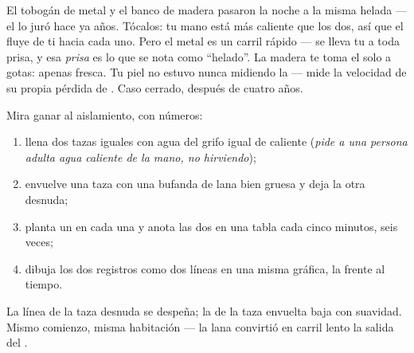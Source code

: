 \begin{example}\label{ex:g5:heat-and-insulation:slide}
El tobogán de metal y el banco de madera pasaron la noche a la misma
 helada --- el  lo juró hace ya años.
Tócalos: tu mano está más caliente que los dos, así que el 
fluye de ti hacia cada uno. Pero el metal es un carril rápido --- se
lleva tu  a toda prisa, y esa \emph{prisa} es lo que se nota
como ``helado''. La madera te toma el  solo a gotas: apenas
fresca. Tu piel no estuvo nunca midiendo la  --- mide
la velocidad de su propia pérdida de . Caso cerrado, después de
cuatro años.
\end{example}

\begin{method}\label{met:g5:heat-and-insulation:race}
Mira ganar al aislamiento, con números:
\begin{enumerate}
  \item llena dos tazas iguales con agua del grifo igual de caliente
        (\emph{pide a una persona adulta agua caliente de la mano, no
        hirviendo});
  \item envuelve una taza con una bufanda de lana bien gruesa y deja
        la otra desnuda;
  \item planta un  en cada una y anota las dos
         en una tabla cada cinco minutos, seis veces;
  \item dibuja los dos registros como dos líneas en una misma
        gráfica, la  frente al tiempo.
\end{enumerate}
La línea de la taza desnuda se despeña; la de la taza envuelta baja
con suavidad. Mismo comienzo, misma habitación --- la lana convirtió
en carril lento la salida del .
\end{method}

